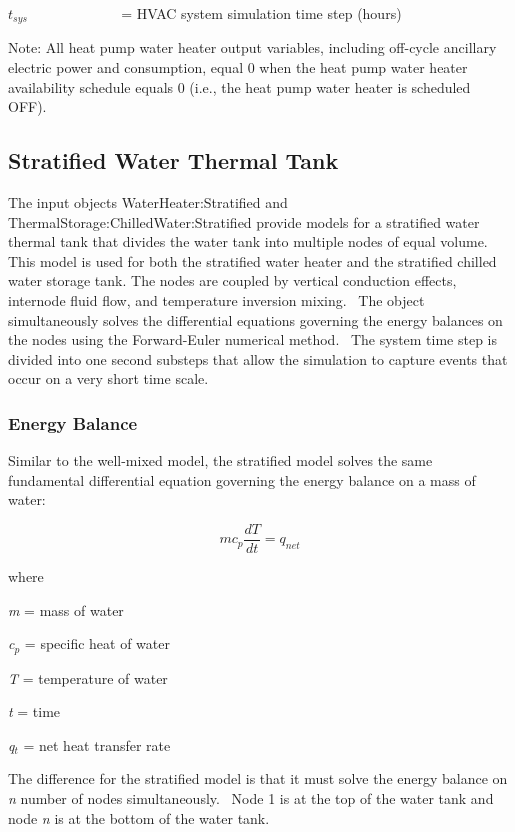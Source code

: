\({t_{sys}}\) ~~~~~~~~~~~~ = HVAC system simulation time step (hours)

Note: All heat pump water heater output variables, including off-cycle ancillary electric power and consumption, equal 0 when the heat pump water heater availability schedule equals 0 (i.e., the heat pump water heater is scheduled OFF).

\subsection{Stratified Water Thermal Tank}\label{stratified-water-thermal-tank}

The input objects WaterHeater:Stratified and ThermalStorage:ChilledWater:Stratified provide models for a stratified water thermal tank that divides the water tank into multiple nodes of equal volume.~ This model is used for both the stratified water heater and the stratified chilled water storage tank. The nodes are coupled by vertical conduction effects, internode fluid flow, and temperature inversion mixing.~ The object simultaneously solves the differential equations governing the energy balances on the nodes using the Forward-Euler numerical method.~ The system time step is divided into one second substeps that allow the simulation to capture events that occur on a very short time scale.

\subsubsection{Energy Balance}\label{energy-balance-1}

Similar to the well-mixed model, the stratified model solves the same fundamental differential equation governing the energy balance on a mass of water:

\begin{equation}
m{c_p}\frac{{dT}}{{dt}} = {q_{net}}
\end{equation}

where

\emph{m} = mass of water

\emph{c\(_{p}\)} = specific heat of water

\emph{T} = temperature of water

\emph{t} = time

\emph{q\(_{t}\)} = net heat transfer rate

The difference for the stratified model is that it must solve the energy balance on \emph{n} number of nodes simultaneously.~ Node 1 is at the top of the water tank and node \emph{n} is at the bottom of the water tank.

